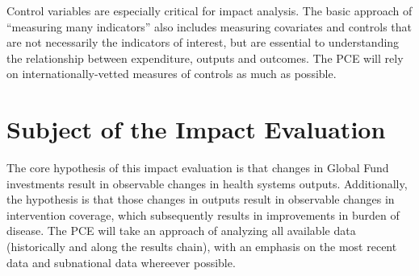 \documentclass[twocolumn]{bmcart}%
\begin{document}
Control variables are especially critical for impact analysis. The basic approach of ``measuring many indicators'' also includes measuring covariates and controls that are not necessarily the indicators of interest, but are essential to understanding the relationship between expenditure, outputs and outcomes. The PCE will rely on internationally-vetted measures of controls as much as possible. \\









\section{Subject of the Impact Evaluation} \label{hypothesis}

The core hypothesis of this impact evaluation is that changes in Global Fund investments result in observable changes in health systems outputs. Additionally, the hypothesis is that those changes in outputs result in observable changes in intervention coverage, which subsequently results in improvements in burden of disease. The PCE will take an approach of analyzing all available data (historically and along the results chain), with an emphasis on the most recent data and subnational data whereever possible. \\
\end{document}
